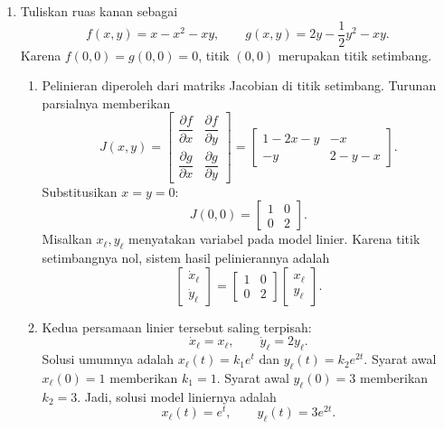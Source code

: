 \documentclass[11pt,a4paper]{article}
\begin{document}
\begin{enumerate}[itemsep=12pt,parsep=5pt]
  \item Tuliskan ruas kanan sebagai
        \[
          f(x,y)=x-x^2-xy,\qquad g(x,y)=2y-\frac12y^2-xy.
        \]
        Karena $f(0,0)=g(0,0)=0$, titik $(0,0)$ merupakan titik setimbang.
        \begin{enumerate}
          \item Pelinieran diperoleh dari matriks Jacobian di titik setimbang.
                Turunan parsialnya memberikan
                \[
                  J(x,y)=\begin{bmatrix}
                    \dfrac{\partial f}{\partial x}&\dfrac{\partial f}{\partial y}\\[5pt]
                    \dfrac{\partial g}{\partial x}&\dfrac{\partial g}{\partial y}
                  \end{bmatrix}
                  =\begin{bmatrix}1-2x-y&-x\\-y&2-y-x\end{bmatrix}.
                \]
                Substitusikan $x=y=0$:
                \[
                  J(0,0)=\begin{bmatrix}1&0\\0&2\end{bmatrix}.
                \]
                Misalkan $x_{\ell},y_{\ell}$ menyatakan variabel pada model linier.
                Karena titik setimbangnya nol, sistem hasil pelinierannya adalah
                \[
                  \begin{bmatrix}\dot{x}_{\ell}\\\dot{y}_{\ell}\end{bmatrix}
                  =\begin{bmatrix}1&0\\0&2\end{bmatrix}
                   \begin{bmatrix}x_{\ell}\\y_{\ell}\end{bmatrix}.
                \]

          \item Kedua persamaan linier tersebut saling terpisah:
                \[
                  \dot{x}_{\ell}=x_{\ell},\qquad \dot{y}_{\ell}=2y_{\ell}.
                \]
                Solusi umumnya adalah $x_{\ell}(t)=k_1e^t$ dan $y_{\ell}(t)=k_2e^{2t}$.
                Syarat awal $x_{\ell}(0)=1$ memberikan $k_1=1$.
                Syarat awal $y_{\ell}(0)=3$ memberikan $k_2=3$.
                Jadi, solusi model liniernya adalah
                \[
                  x_{\ell}(t)=e^t,\qquad y_{\ell}(t)=3e^{2t}.
                \]
        \end{enumerate}


\end{enumerate}
\end{document}
